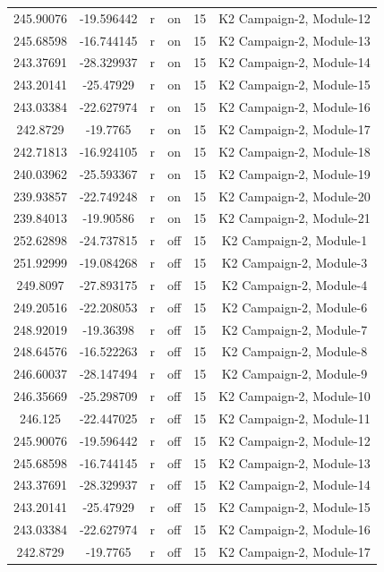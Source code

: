 \documentclass[11pt]{article}
\begin{document}
\begin{center}
\begin{longtable}{|c|c|c|c|c|c|}
245.90076 & -19.596442 & r & on &15 & K2 Campaign-2, Module-12\\
245.68598 & -16.744145 & r & on &15 & K2 Campaign-2, Module-13\\
243.37691 & -28.329937 & r & on &15 & K2 Campaign-2, Module-14\\
243.20141 & -25.47929 & r & on &15 & K2 Campaign-2, Module-15\\
243.03384 & -22.627974 & r & on &15 & K2 Campaign-2, Module-16\\
242.8729 & -19.7765 & r & on &15 & K2 Campaign-2, Module-17\\
242.71813 & -16.924105 & r & on &15 & K2 Campaign-2, Module-18\\
240.03962 & -25.593367 & r & on &15 & K2 Campaign-2, Module-19\\
239.93857 & -22.749248 & r & on &15 & K2 Campaign-2, Module-20\\
239.84013 & -19.90586 & r & on &15 & K2 Campaign-2, Module-21\\
252.62898 & -24.737815 & r & off &15 & K2 Campaign-2, Module-1\\
251.92999 & -19.084268 & r & off &15 & K2 Campaign-2, Module-3\\
249.8097 & -27.893175 & r & off &15 & K2 Campaign-2, Module-4\\
249.20516 & -22.208053 & r & off &15 & K2 Campaign-2, Module-6\\
248.92019 & -19.36398 & r & off &15 & K2 Campaign-2, Module-7\\
248.64576 & -16.522263 & r & off &15 & K2 Campaign-2, Module-8\\
246.60037 & -28.147494 & r & off &15 & K2 Campaign-2, Module-9\\
246.35669 & -25.298709 & r & off &15 & K2 Campaign-2, Module-10\\
246.125 & -22.447025 & r & off &15 & K2 Campaign-2, Module-11\\
245.90076 & -19.596442 & r & off &15 & K2 Campaign-2, Module-12\\
245.68598 & -16.744145 & r & off &15 & K2 Campaign-2, Module-13\\
243.37691 & -28.329937 & r & off &15 & K2 Campaign-2, Module-14\\
243.20141 & -25.47929 & r & off &15 & K2 Campaign-2, Module-15\\
243.03384 & -22.627974 & r & off &15 & K2 Campaign-2, Module-16\\
242.8729 & -19.7765 & r & off &15 & K2 Campaign-2, Module-17\\

\end{longtable}
\end{center}
\end{document}

